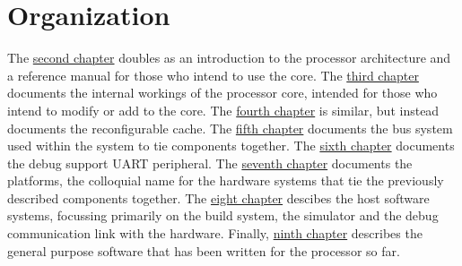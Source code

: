 \section{Organization}
\label{sec:introduction-org}

The \hyperref[sec:core-ug]{second chapter} doubles as an introduction to the 
\rvex{} processor architecture and a reference manual for those who intend to 
use the core. The \hyperref[sec:core-int]{third chapter} documents the internal 
workings of the \rvex{} processor core, intended for those who intend to modify 
or add to the core. The \hyperref[sec:cache]{fourth chapter} is similar, but 
instead documents the reconfigurable cache. The \hyperref[sec:bus]{fifth 
chapter} documents the bus system used within the \rvex{} system to tie 
components together. The \hyperref[sec:debug]{sixth chapter} documents the debug 
support UART peripheral. The \hyperref[sec:platforms]{seventh chapter} documents 
the \rvex{} platforms, the colloquial name for the hardware systems that tie 
the previously described components together. The \hyperref[sec:host]{eight 
chapter} descibes the host software systems, focussing primarily on the build 
system, the simulator and the debug communication link with the hardware. 
Finally, \hyperref[sec:target]{ninth chapter} describes the general purpose 
software that has been written for the \rvex{} processor so far.





